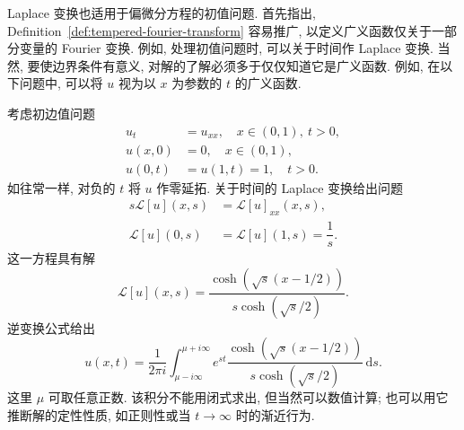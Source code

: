 \begin{Example}
\label{ex:heat-boundary-laplace}
Laplace 变换也适用于偏微分方程的初值问题. 首先指出, Definition~\ref{def:tempered-fourier-transform} 容易推广, 以定义广义函数仅关于一部分变量的 Fourier 变换. 例如, 处理初值问题时, 可以关于时间作 Laplace 变换. 当然, 要使边界条件有意义, 对解的了解必须多于仅仅知道它是广义函数. 例如, 在以下问题中, 可以将 $u$ 视为以 $x$ 为参数的 $t$ 的广义函数.

考虑初边值问题
\begin{equation}\label{eq:heat-unit-boundary-zero-initial-problem}
\begin{aligned}
u_t&=u_{xx},\quad x\in(0,1),\ t>0,\\
u(x,0)&=0,\quad x\in(0,1),\\
u(0,t)&=u(1,t)=1,\quad t>0.
\end{aligned}
\end{equation}
如往常一样, 对负的 $t$ 将 $u$ 作零延拓. 关于时间的 Laplace 变换给出问题
\begin{equation}\label{eq:heat-unit-boundary-laplace-problem}
\begin{aligned}
s\mathcal{L}[u](x,s)&=\mathcal{L}[u]_{xx}(x,s),\\
\mathcal{L}[u](0,s)&=\mathcal{L}[u](1,s)=\dfrac1s.
\end{aligned}
\end{equation}
这一方程具有解
\begin{equation}\label{eq:heat-unit-boundary-laplace-solution}
\mathcal{L}[u](x,s)=\dfrac{\cosh(\sqrt s(x-1/2))}{s\cosh(\sqrt s/2)}.
\end{equation}
逆变换公式给出
\begin{equation}\label{eq:heat-unit-boundary-inverse-laplace-formula}
u(x,t)=\dfrac1{2\pi i}\int_{\mu-i\infty}^{\mu+i\infty}e^{st}\dfrac{\cosh(\sqrt s(x-1/2))}{s\cosh(\sqrt s/2)}\,\mathrm{d}s.
\end{equation}
这里 $\mu$ 可取任意正数. 该积分不能用闭式求出, 但当然可以数值计算; 也可以用它推断解的定性性质, 如正则性或当 $t\to\infty$ 时的渐近行为.
\end{Example}
